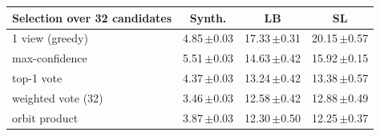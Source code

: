 \begin{tabular}{@{}l ccc@{}}
\toprule
Selection over 32 candidates & Synth. & LB & SL \\
\midrule
1 view (greedy) & 4.85\,{\scriptsize$\pm$0.03} & 17.33\,{\scriptsize$\pm$0.31} & 20.15\,{\scriptsize$\pm$0.57} \\
max-confidence & 5.51\,{\scriptsize$\pm$0.03} & 14.63\,{\scriptsize$\pm$0.42} & 15.92\,{\scriptsize$\pm$0.15} \\
top-1 vote & 4.37\,{\scriptsize$\pm$0.03} & 13.24\,{\scriptsize$\pm$0.42} & 13.38\,{\scriptsize$\pm$0.57} \\
weighted vote (32) & 3.46\,{\scriptsize$\pm$0.03} & 12.58\,{\scriptsize$\pm$0.42} & 12.88\,{\scriptsize$\pm$0.49} \\
orbit product & 3.87\,{\scriptsize$\pm$0.03} & 12.30\,{\scriptsize$\pm$0.50} & 12.25\,{\scriptsize$\pm$0.37} \\
\bottomrule
\end{tabular}